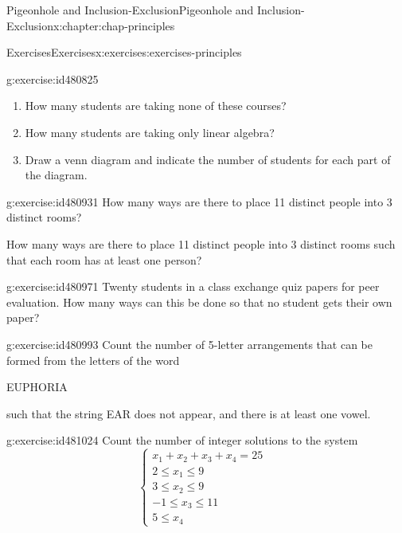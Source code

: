 \documentclass[oneside,10pt,]{book}
\numberwithin{equation}{section}
\newcommand{\amp}{&}
\begin{document}
\begin{chapterptx}{Pigeonhole and Inclusion-Exclusion}{}{Pigeonhole and Inclusion-Exclusion}{}{}{x:chapter:chap-principles}
\begin{exercises-section}{Exercises}{}{Exercises}{}{}{x:exercises:exercises-principles}
\begin{divisionexercise}{9}{}{}{g:exercise:id480825}
%
\begin{enumerate}[label=(\alph*)]
\item{}How many students are taking none of these courses?%
\item{}How many students are taking only linear algebra?%
\item{}Draw a venn diagram and indicate the number of students for each part of the diagram.%
\end{enumerate}
%
\end{divisionexercise}%
\begin{divisionexercise}{10}{}{}{g:exercise:id480931}%
How many ways are there to place 11 distinct people into 3 distinct rooms?%
\par
How many ways are there to place 11 distinct people into 3 distinct rooms such that each room has at least one person?%
\end{divisionexercise}%
\begin{divisionexercise}{11}{}{}{g:exercise:id480971}%
Twenty students in a class exchange quiz papers for peer evaluation. How many ways can this be done so that no student gets their own paper?%
\end{divisionexercise}%
\begin{divisionexercise}{12}{}{}{g:exercise:id480993}%
Count the number of 5-letter arrangements that can be formed from the letters of the word%
\begin{sidebyside}{1}{0.375}{0.375}{0}%
\begin{sbspanel}{0.25}%
EUPHORIA%
\end{sbspanel}%
\end{sidebyside}%
\par
such that the string EAR does not appear, and there is at least one vowel.%
\end{divisionexercise}%
\begin{divisionexercise}{13}{}{}{g:exercise:id481024}%
Count the number of integer solutions to the system%
\begin{equation*}
\begin{cases} x_1 + x_2 + x_3 + x_4 = 25 \amp \\ 
2 \leq x_1 \leq 9 \amp \\
3 \leq x_2 \leq 9 \amp \\
-1 \leq x_3 \leq 11 \amp \\
5 \leq x_4 \ \ \amp \end{cases}
\end{equation*}
%
\end{divisionexercise}%

\end{exercises-section}
\end{chapterptx}
\end{document}
